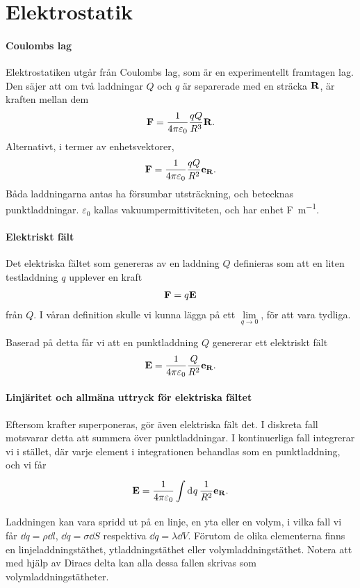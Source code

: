 \section{Elektrostatik}

\paragraph{Coulombs lag}
Elektrostatiken utgår från Coulombs lag, som är en experimentellt framtagen lag. Den säjer att om två laddningar $Q$ och $q$ är separerade med en sträcka $\vb{R}$, är kraften mellan dem
\begin{align*}
	\vb{F} = \frac{1}{4\pi\varepsilon_{0}}\frac{qQ}{R^{3}}\vb{R}.
\end{align*}
Alternativt, i termer av enhetsvektorer,
\begin{align*}
	\vb{F} = \frac{1}{4\pi\varepsilon_{0}}\frac{qQ}{R^{2}}\vb{e}_{\vb{R}}.
\end{align*}
Båda laddningarna antas ha försumbar utsträckning, och betecknas punktladdningar. $\varepsilon_{0}$ kallas vakuumpermittiviteten, och har enhet \si{\farad\per\meter}.

\paragraph{Elektriskt fält}
Det elektriska fältet som genereras av en laddning $Q$ definieras som att en liten testladdning $q$ upplever en kraft
\begin{align*}
	\vb{F} = q\vb{E}
\end{align*}
från $Q$. I våran definition skulle vi kunna lägga på ett $\lim\limits_{q\to 0}$, för att vara tydliga.

Baserad på detta får vi att en punktladdning $Q$ genererar ett elektriskt fält
\begin{align*}
	\vb{E} = \frac{1}{4\pi\varepsilon_{0}}\frac{Q}{R^{2}}\vb{e}_{\vb{R}}.
\end{align*}

\paragraph{Linjäritet och allmäna uttryck för elektriska fältet}
Eftersom krafter superponeras, gör även elektriska fält det. I diskreta fall motsvarar detta att summera över punktladdningar. I kontinuerliga fall integrerar vi i stället, där varje element i integrationen behandlas som en punktladdning, och vi får
\begin{align*}
	\vb{E} = \frac{1}{4\pi\varepsilon_{0}}\int\limits_{}^{}\dd[]{q}\frac{1}{R^{2}}\vb{e}_{\vb{R}}.
\end{align*}
Laddningen kan vara spridd ut på en linje, en yta eller en volym, i vilka fall vi får $\dd{q} = \rho\dd{l}$, $\dd{q} = \sigma\dd{S}$ respektiva $\dd{q} = \lambda\dd{V}$. Förutom de olika elementerna finns en linjeladdningstäthet, ytladdningstäthet eller volymladdningstäthet. Notera att med hjälp av Diracs delta kan alla dessa fallen skrivas som volymladdningstätheter.

